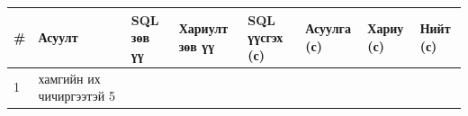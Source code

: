 \begingroup\scriptsize\begin{longtable}[]{@{}llllllll@{}}
\toprule
\begin{minipage}[b]{0.10\columnwidth}\raggedright
\#\strut
\end{minipage} & \begin{minipage}[b]{0.10\columnwidth}\raggedright
Асуулт\strut
\end{minipage} & \begin{minipage}[b]{0.10\columnwidth}\raggedright
SQL зөв үү\strut
\end{minipage} & \begin{minipage}[b]{0.10\columnwidth}\raggedright
Хариулт зөв үү\strut
\end{minipage} & \begin{minipage}[b]{0.10\columnwidth}\raggedright
SQL үүсгэх (с)\strut
\end{minipage} & \begin{minipage}[b]{0.10\columnwidth}\raggedright
Асуулга (с)\strut
\end{minipage} & \begin{minipage}[b]{0.10\columnwidth}\raggedright
Хариу (с)\strut
\end{minipage} & \begin{minipage}[b]{0.10\columnwidth}\raggedright
Нийт (с)\strut
\end{minipage}\tabularnewline
\midrule
\endhead
\begin{minipage}[t]{0.10\columnwidth}\raggedright
1\strut
\end{minipage} & \begin{minipage}[t]{0.10\columnwidth}\raggedright
хамгийн их чичиргээтэй 5\strut
\end{minipage} & \begin{minipage}[t]{0.10\columnwidth}\raggedright
\strut
\end{minipage} & \begin{minipage}[t]{0.10\columnwidth}\raggedright
\strut
\end{minipage} & \begin{minipage}[t]{0.10\columnwidth}\raggedright
\strut
\end{minipage} & \begin{minipage}[t]{0.10\columnwidth}\raggedright
\strut
\end{minipage} & \begin{minipage}[t]{0.10\columnwidth}\raggedright
\strut
\end{minipage} & \begin{minipage}[t]{0.10\columnwidth}\raggedright

\end{minipage}
\end{longtable}
